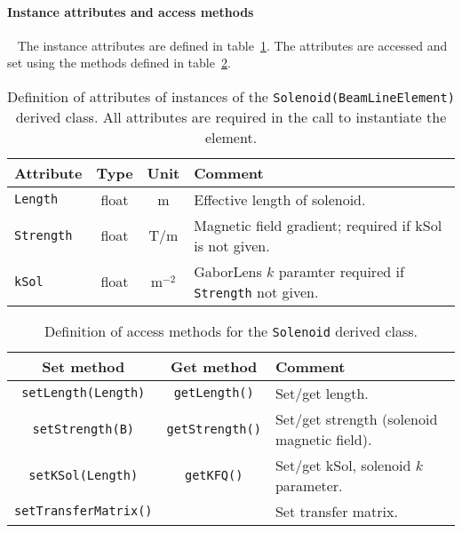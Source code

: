 \paragraph{Instance attributes and access methods} ~\newline
\label{SubSubSect:Slnd:InstAttr}
\noindent
The instance attributes are defined in
table~\ref{Tab:Slnd:Attributes}. 
The attributes are accessed and set using the methods defined in
table~\ref{Tab:Slnd:Methods}.
\begin{table}[h]
  \caption{
    Definition of attributes of instances of
    the \texttt{Solenoid(BeamLineElement)} derived class.
    All attributes are required in the call to instantiate the
    element.
  }
  \label{Tab:Slnd:Attributes}
  \begin{center}
    \begin{tabular}{|l|c|c|p{10cm}|}
      \hline
      \textbf{Attribute}   & \textbf{Type} & \textbf{Unit} & \textbf{Comment}                     \\
      \hline
      \texttt{Length}   & float & m     & Effective length of solenoid.                           \\
      \texttt{Strength} & float & T/m   & Magnetic field gradient; required if kSol is not given. \\
      \texttt{kSol}     & float & m$^{-2}$ & GaborLens $k$ paramter required if \texttt{Strength}
                                          not given.                                              \\
      \hline
    \end{tabular}
  \end{center}
\end{table}
\begin{table}[h]
  \caption{
    Definition of access methods for the \texttt{Solenoid} derived
    class. 
  }
  \label{Tab:Slnd:Methods}
  \begin{center}
    \begin{tabular}{|c|c|p{7cm}|}
      \hline
      \textbf{Set method} & \textbf{Get method}  & \textbf{Comment}                                  \\
      \hline
      \texttt{setLength(Length)}   & \texttt{getLength()}   & Set/get length.                        \\
      \texttt{setStrength(B)}      & \texttt{getStrength()} & Set/get strength (solenoid magnetic
                                                              field).                                \\
      \texttt{setKSol(Length)}     & \texttt{getKFQ()}      & Set/get kSol, solenoid $k$ parameter.  \\
      \texttt{setTransferMatrix()} &                        & Set transfer matrix.                   \\
      \hline
    \end{tabular}
  \end{center}
\end{table}

